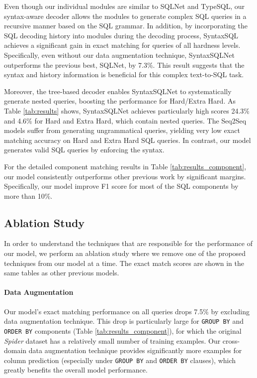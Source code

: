 \documentclass[11pt,a4paper]{article}
\begin{document}
Even though our individual modules are similar to SQLNet and TypeSQL, 
our syntax-aware decoder
allows the modules to generate complex SQL queries in a recursive manner based on the SQL grammar. 
In addition, by incorporating the SQL decoding history into modules during the decoding process, SyntaxSQL achieves a significant gain in exact matching for queries of all hardness levels.
Specifically, even without our data augmentation technique, SyntaxSQLNet outperforms the previous best, SQLNet, by 7.3\%.
This result suggests that the syntax and history information is beneficial for this complex text-to-SQL task.

Moreover, the tree-based decoder enables SyntaxSQLNet to systematically generate nested queries, boosting the performance for Hard/Extra Hard.
As Table \ref{tab:results} shows, SyntaxSQLNet achieves particularly high scores 24.3\% and 4.6\% for Hard and Extra Hard, which contain nested queries. 
The Seq2Seq models suffer from generating ungrammatical queries, yielding very low exact matching accuracy on Hard and Extra Hard SQL queries. In contrast, our model generates valid SQL queries by enforcing the syntax.

For the detailed component matching results in Table \ref{tab:results_component}, our model consistently outperforms other previous work by significant margins. Specifically, our model improve F1 score for most of the SQL components by more than 10\%.


\subsection{Ablation Study}
In order to understand the techniques that are responsible for the performance of our model, we perform an ablation study where we remove one of the proposed techniques from our model at a time. The exact match scores are shown in the same tables as other previous models.

\paragraph{Data Augmentation}
Our model's exact matching performance on all queries drops 7.5\% by excluding data augmentation technique. 
This drop is particularly large for \texttt{GROUP BY} and \texttt{ORDER BY} components (Table \ref{tab:results_component}), for which the original \textit{Spider} dataset has a relatively small number of training examples.
Our cross-domain data augmentation technique provides significantly more examples for column prediction (especially under \texttt{GROUP BY} and \texttt{ORDER BY} clauses), which greatly benefits the overall model performance.
\end{document}
